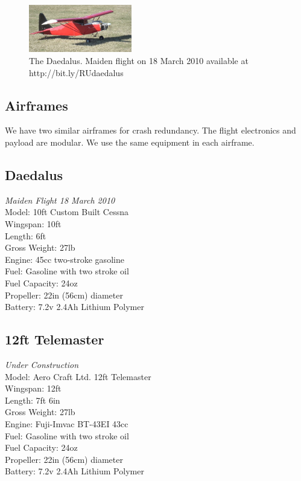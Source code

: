 \documentclass[10pt]{article}
\begin{document}
\begin{figure}[b]
  \centering
    \includegraphics[width=0.4\textwidth]{./images/daedalus.jpg}
  \captionsetup{width=.70\textwidth}
  \caption{The Daedalus. Maiden flight on 18 March 2010 available at http://bit.ly/RUdaedalus}
\end{figure}
\begin{multicols}{2}
\section{Airframes}
We have two similar airframes for crash redundancy. The flight electronics and payload are modular. We use the same equipment in each airframe.
\subsection{Daedalus}
\emph{Maiden Flight 18 March 2010}
\\Model: 10ft Custom Built Cessna
\\Wingspan: 10ft
\\Length: 6ft
\\Gross Weight: 27lb
\\Engine: 45cc two-stroke gasoline
\\Fuel: Gasoline with two stroke oil
\\Fuel Capacity: 24oz
\\Propeller: 22in (56cm) diameter
\\Battery: 7.2v 2.4Ah Lithium Polymer
\subsection{12ft Telemaster}
\emph{Under Construction}
\\Model: Aero Craft Ltd. 12ft Telemaster
\\Wingspan: 12ft
\\Length: 7ft 6in
\\Gross Weight: 27lb
\\Engine: Fuji-Imvac BT-43EI 43cc
\\Fuel: Gasoline with two stroke oil
\\Fuel Capacity: 24oz
\\Propeller: 22in (56cm) diameter
\\Battery: 7.2v 2.4Ah Lithium Polymer


\end{multicols}
\end{document}
